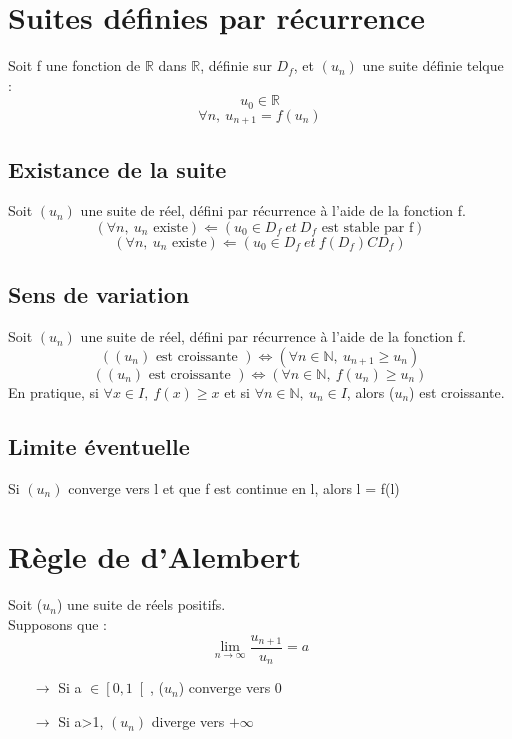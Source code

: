 \section{Suites définies par récurrence}
\begin{de}
Soit f une fonction de $\mathbb{R}$ dans $\mathbb{R}$, définie sur $D_f$, et $(u_n)$ une suite définie telque :
$$u_0 \in \mathbb{R}$$
$$\forall n,~ u_{n+1} = f(u_n)$$
\end{de}
\subsection{Existance de la suite}
\begin{prop}
Soit $(u_n)$ une suite de réel, défini par récurrence à l'aide de la fonction f.
$$(\forall n,~ u_n \mbox{ existe}) \Leftarrow (u_0 \in D_f~ et~ D_f \mbox{ est stable par f})$$
$$(\forall n,~ u_n \mbox{ existe}) \Leftarrow (u_0 \in D_f~ et~ f(D_f) C D_f) $$
\end{prop}
\subsection{Sens de variation}
\begin{prop}
Soit $(u_n)$ une suite de réel, défini par récurrence à l'aide de la fonction f.
$$( (u_n) \mbox{ est croissante }) \Leftrightarrow (\forall n \in \mathbb{N},~ u_{n+1}\geq u_n)$$
$$( (u_n) \mbox{ est croissante }) \Leftrightarrow (\forall n \in \mathbb{N},~ f(u_n)\geq u_n)$$
En pratique, si $\forall x \in I,~ f(x) \geq x$ et si $\forall n \in \mathbb{N},~ u_n\in I$, alors ($u_n$) est croissante. 
\end{prop}
\subsection{Limite éventuelle}
Si $(u_n)$ converge vers l et que f est continue en l, alors l = f(l)
\section{Règle de d'Alembert}
Soit ($u_n$) une suite de réels positifs.\\
Supposons que :
$$\lim_{n \rightarrow \infty} \dfrac{u_{n+1}}{u_n} = a$$
\begin{itemize}
 \item[$\rightarrow$] Si a $\in \left[0,1\right[$, ($u_n$) converge vers 0
 \item[$\rightarrow$] Si a>1, $(u_n)$ diverge vers $+\infty$
\end{itemize}
